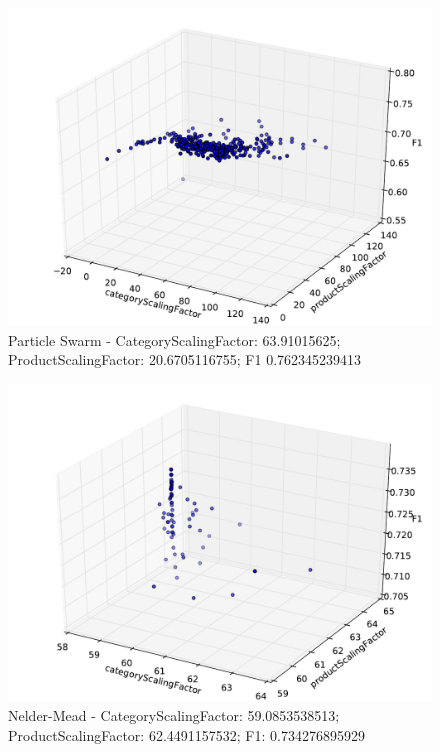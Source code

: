 \documentclass{article}
\begin{document}
\begin{figure}[!htb]
\centering
\includegraphics[width=\textwidth]{firefox/ps_firefox.pdf}
\caption{Particle Swarm - CategoryScalingFactor: 63.91015625; ProductScalingFactor: 20.6705116755; F1 0.762345239413 }
\label{fig:FParticle-Swarm}
\end{figure}

\begin{figure}[!htb]
\centering
\includegraphics[width=\textwidth]{firefox/nm_firefox.pdf}
\caption{Nelder-Mead - CategoryScalingFactor: 59.0853538513; ProductScalingFactor: 62.4491157532; F1: 0.734276895929}
\label{fig:FNelder-Mead}
\end{figure}
\end{document}
